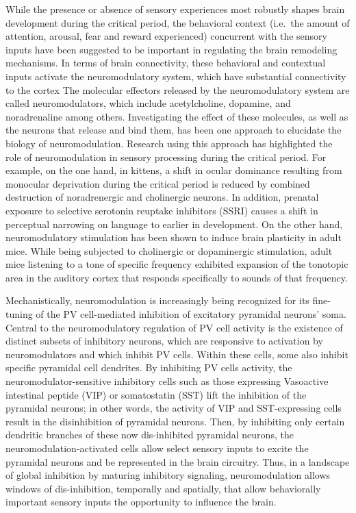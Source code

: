 While the presence or absence of sensory experiences most robustly shapes brain development during the critical period, the behavioral context (i.e.~the amount of attention, arousal, fear and reward experienced) concurrent with the sensory inputs have been suggested to be important in regulating the brain remodeling mechanisms. In terms of brain connectivity, these behavioral and contextual inputs activate the neuromodulatory system, which have substantial connectivity to the cortex The molecular effectors released by the neuromodulatory system are called neuromodulators, which include acetylcholine, dopamine, and noradrenaline among others. Investigating the effect of these molecules, as well as the neurons that release and bind them, has been one approach to elucidate the biology of neuromodulation. Research using this approach has highlighted the role of neuromodulation in sensory processing during the critical period. For example, on the one hand, in kittens, a shift in ocular dominance resulting from monocular deprivation during the critical period is reduced by combined destruction of noradrenergic and cholinergic neurons. In addition, prenatal exposure to selective serotonin reuptake inhibitors (SSRI) causes a shift in perceptual narrowing on language to earlier in development. On the other hand, neuromodulatory stimulation has been shown to induce brain plasticity in adult mice. While being subjected to cholinergic or dopaminergic stimulation, adult mice listening to a tone of specific frequency exhibited expansion of the tonotopic area in the auditory cortex that responds specifically to sounds of that frequency.

Mechanistically, neuromodulation is increasingly being recognized for its fine-tuning of the PV cell-mediated inhibition of excitatory pyramidal neurons' soma. Central to the neuromodulatory regulation of PV cell activity is the existence of distinct subsets of inhibitory neurons, which are responsive to activation by neuromodulators and which inhibit PV cells. Within these cells, some also inhibit specific pyramidal cell dendrites. By inhibiting PV cells activity, the neuromodulator-sensitive inhibitory cells such as those expressing Vasoactive intestinal peptide (VIP) or somatostatin (SST) lift the inhibition of the pyramidal neurons; in other words, the activity of VIP and SST-expressing cells result in the disinhibition of pyramidal neurons. Then, by inhibiting only certain dendritic branches of these now dis-inhibited pyramidal neurons, the neuromodulation-activated cells allow select sensory inputs to excite the pyramidal neurons and be represented in the brain circuitry. Thus, in a landscape of global inhibition by maturing inhibitory signaling, neuromodulation allows windows of dis-inhibition, temporally and spatially, that allow behaviorally important sensory inputs the opportunity to influence the brain.

